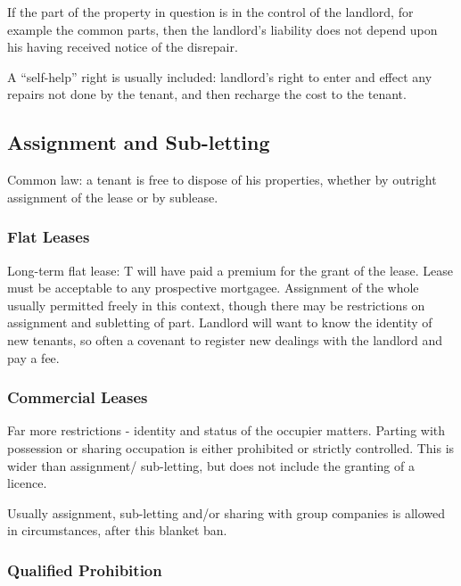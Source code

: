 \documentclass[
]{article}
\begin{document}
If the part of the property in question is in the control of the
landlord, for example the common parts, then the landlord's liability
does not depend upon his having received notice of the disrepair.

A ``self-help'' right is usually included: landlord's right to enter and
effect any repairs not done by the tenant, and then recharge the cost to
the tenant.

\hypertarget{assignment-and-sub-letting}{%
\subsection{Assignment and
Sub-letting}\label{assignment-and-sub-letting}}

Common law: a tenant is free to dispose of his properties, whether by
outright assignment of the lease or by sublease.

\hypertarget{flat-leases}{%
\subsubsection{Flat Leases}\label{flat-leases}}

Long-term flat lease: T will have paid a premium for the grant of the
lease. Lease must be acceptable to any prospective mortgagee. Assignment
of the whole usually permitted freely in this context, though there may
be restrictions on assignment and subletting of part. Landlord will want
to know the identity of new tenants, so often a covenant to register new
dealings with the landlord and pay a fee.

\hypertarget{commercial-leases-1}{%
\subsubsection{Commercial Leases}\label{commercial-leases-1}}

Far more restrictions - identity and status of the occupier matters.
Parting with possession or sharing occupation is either prohibited or
strictly controlled. This is wider than assignment/ sub-letting, but
does not include the granting of a licence.

Usually assignment, sub-letting and/or sharing with group companies is
allowed in circumstances, after this blanket ban.

\hypertarget{qualified-prohibition}{%
\subsubsection{Qualified Prohibition}\label{qualified-prohibition}}
\end{document}
